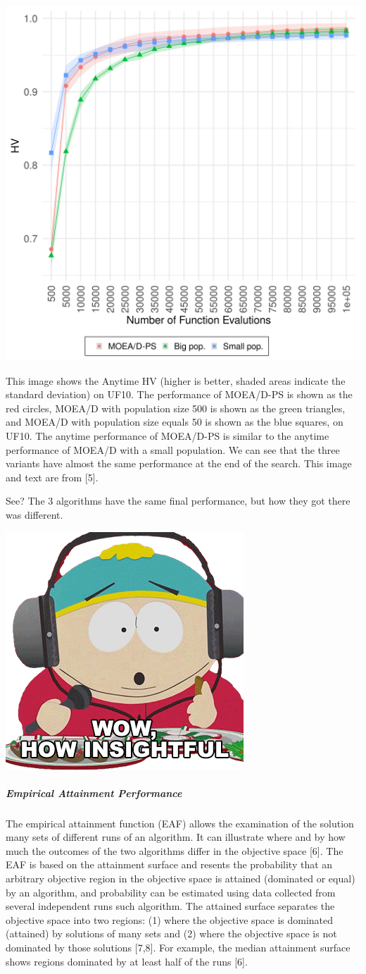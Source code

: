 \documentclass[
]{article}
\begin{document}
\begin{center}\includegraphics[width=0.45\linewidth]{imgs/UF10hv_evolution} \end{center}

This image shows the Anytime HV (higher is better, shaded areas indicate
the standard deviation) on UF10. The performance of MOEA/D-PS is shown
as the red circles, MOEA/D with population size 500 is shown as the
green triangles, and MOEA/D with population size equals 50 is shown as
the blue squares, on UF10. The anytime performance of MOEA/D-PS is
similar to the anytime performance of MOEA/D with a small population. We
can see that the three variants have almost the same performance at the
end of the search. This image and text are from {[}5{]}.

See? The 3 algorithms have the same final performance, but how they got
there was different.

\begin{center}\includegraphics[width=0.4\linewidth]{gifs/insightful} \end{center}

\hypertarget{empirical-attainment-performance}{%
\subparagraph{Empirical Attainment
Performance}\label{empirical-attainment-performance}}

The empirical attainment function (EAF) allows the examination of the
solution many sets of different runs of an algorithm. It can illustrate
where and by how much the outcomes of the two algorithms differ in the
objective space {[}6{]}. The EAF is based on the attainment surface and
resents the probability that an arbitrary objective region in the
objective space is attained (dominated or equal) by an algorithm, and
probability can be estimated using data collected from several
independent runs such algorithm. The attained surface separates the
objective space into two regions: (1) where the objective space is
dominated (attained) by solutions of many sets and (2) where the
objective space is not dominated by those solutions {[}7,8{]}. For
example, the median attainment surface shows regions dominated by at
least half of the runs {[}6{]}.
\end{document}

